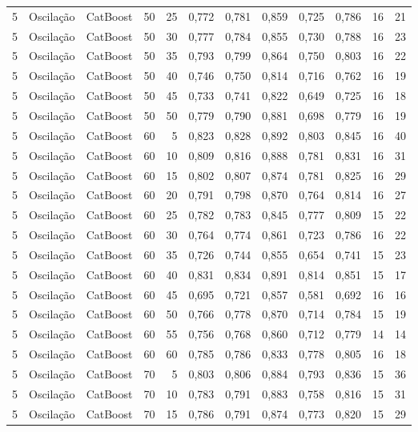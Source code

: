 \begin{longtable}{ccclrrrrrrrr}
5 & Oscilação & CatBoost & 50 & 25 & 0,772 & 0,781 & 0,859 & 0,725 & 0,786 & 16 & 21 \\
5 & Oscilação & CatBoost & 50 & 30 & 0,777 & 0,784 & 0,855 & 0,730 & 0,788 & 16 & 23 \\
5 & Oscilação & CatBoost & 50 & 35 & 0,793 & 0,799 & 0,864 & 0,750 & 0,803 & 16 & 22 \\
5 & Oscilação & CatBoost & 50 & 40 & 0,746 & 0,750 & 0,814 & 0,716 & 0,762 & 16 & 19 \\
5 & Oscilação & CatBoost & 50 & 45 & 0,733 & 0,741 & 0,822 & 0,649 & 0,725 & 16 & 18 \\
5 & Oscilação & CatBoost & 50 & 50 & 0,779 & 0,790 & 0,881 & 0,698 & 0,779 & 16 & 19 \\
5 & Oscilação & CatBoost & 60 & 5 & 0,823 & 0,828 & 0,892 & 0,803 & 0,845 & 16 & 40 \\
5 & Oscilação & CatBoost & 60 & 10 & 0,809 & 0,816 & 0,888 & 0,781 & 0,831 & 16 & 31 \\
5 & Oscilação & CatBoost & 60 & 15 & 0,802 & 0,807 & 0,874 & 0,781 & 0,825 & 16 & 29 \\
5 & Oscilação & CatBoost & 60 & 20 & 0,791 & 0,798 & 0,870 & 0,764 & 0,814 & 16 & 27 \\
5 & Oscilação & CatBoost & 60 & 25 & 0,782 & 0,783 & 0,845 & 0,777 & 0,809 & 15 & 22 \\
5 & Oscilação & CatBoost & 60 & 30 & 0,764 & 0,774 & 0,861 & 0,723 & 0,786 & 16 & 22 \\
5 & Oscilação & CatBoost & 60 & 35 & 0,726 & 0,744 & 0,855 & 0,654 & 0,741 & 15 & 23 \\
5 & Oscilação & CatBoost & 60 & 40 & 0,831 & 0,834 & 0,891 & 0,814 & 0,851 & 15 & 17 \\
5 & Oscilação & CatBoost & 60 & 45 & 0,695 & 0,721 & 0,857 & 0,581 & 0,692 & 16 & 16 \\
5 & Oscilação & CatBoost & 60 & 50 & 0,766 & 0,778 & 0,870 & 0,714 & 0,784 & 15 & 19 \\
5 & Oscilação & CatBoost & 60 & 55 & 0,756 & 0,768 & 0,860 & 0,712 & 0,779 & 14 & 14 \\
5 & Oscilação & CatBoost & 60 & 60 & 0,785 & 0,786 & 0,833 & 0,778 & 0,805 & 16 & 18 \\
5 & Oscilação & CatBoost & 70 & 5 & 0,803 & 0,806 & 0,884 & 0,793 & 0,836 & 15 & 36 \\
5 & Oscilação & CatBoost & 70 & 10 & 0,783 & 0,791 & 0,883 & 0,758 & 0,816 & 15 & 31 \\
5 & Oscilação & CatBoost & 70 & 15 & 0,786 & 0,791 & 0,874 & 0,773 & 0,820 & 15 & 29 \\

\end{longtable}
